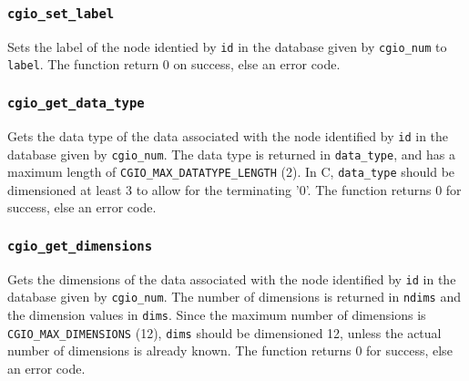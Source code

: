 \subsubsection{\texttt{cgio\_set\_label}} \label{set_label}
    \noindent
    Sets the label of the node identied by \texttt{id} in the database given by
    \texttt{cgio\_num} to \texttt{label}. The function return 0 on success,
    else an error code.

\subsubsection{\texttt{cgio\_get\_data\_type}} \label{get_data_type}
    \noindent
    Gets the data type of the data associated with the node identified by
    \texttt{id} in the database given by \texttt{cgio\_num}.
    The data type is returned in \texttt{data\_type}, and has a
    maximum length of \texttt{CGIO\_MAX\_DATATYPE\_LENGTH} (2).
    In C, \texttt{data\_type} should be dimensioned at least 3 to allow for
    the terminating '0'.
    The function returns 0 for success, else an error code.

\subsubsection{\texttt{cgio\_get\_dimensions}} \label{get_dimensions}
    \noindent
    Gets the dimensions of the data associated with the node identified by
    \texttt{id} in the database given by \texttt{cgio\_num}. The number of
    dimensions is returned in \texttt{ndims} and the dimension values
    in \texttt{dims}. Since the maximum number of dimensions is
    \texttt{CGIO\_MAX\_DIMENSIONS} (12), \texttt{dims} should be dimensioned
    12, unless the actual number of dimensions is already known.
    The function returns 0 for success, else an error code.

